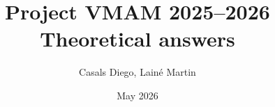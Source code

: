 \title{\textbf{Project VMAM 2025--2026}\\Theoretical answers}
\author{Casals Diego, Lainé Martin}
\date{May 2026}
